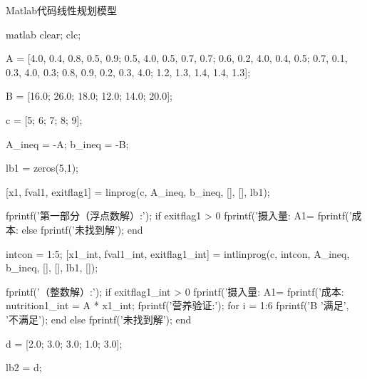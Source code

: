 \begin{codebox}{Matlab代码}{线性规划模型}
    \begin{amzcode}{matlab}
        clear; clc;
        
        A = [4.0, 0.4, 0.8, 0.5, 0.9;
             0.5, 4.0, 0.5, 0.7, 0.7;
             0.6, 0.2, 4.0, 0.4, 0.5;
             0.7, 0.1, 0.3, 4.0, 0.3;
             0.8, 0.9, 0.2, 0.3, 4.0;
             1.2, 1.3, 1.4, 1.4, 1.3];
        
        B = [16.0; 26.0; 18.0; 12.0; 14.0; 20.0];
        
        c = [5; 6; 7; 8; 9];
        
        A_ineq = -A;
        b_ineq = -B;
        
        
        lb1 = zeros(5,1);
        
        [x1, fval1, exitflag1] = linprog(c, A_ineq, b_ineq, [], [], lb1);
        
        fprintf('第一部分（浮点数解）:\n');
        if exitflag1 > 0
            fprintf('摄入量: A1=%
            fprintf('成本: %
        else
            fprintf('未找到解\n');
        end
        
        intcon = 1:5;
        [x1_int, fval1_int, exitflag1_int] = intlinprog(c, intcon, A_ineq, b_ineq, [], [], lb1, []);
        
        fprintf('（整数解）:\n');
        if exitflag1_int > 0
            fprintf('摄入量: A1=%
            fprintf('成本: %
            nutrition1_int = A * x1_int;
            fprintf('营养验证:\n');
            for i = 1:6
                fprintf('B%
                        '满足', '不满足');
            end
        else
            fprintf('未找到解\n');
        end
        
        
        d = [2.0; 3.0; 3.0; 1.0; 3.0];
        
        lb2 = d;
        

\end{amzcode}
\end{codebox}
